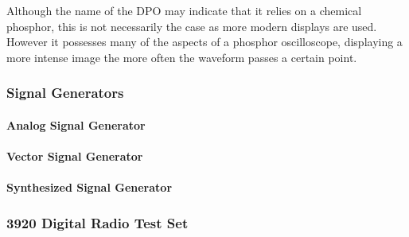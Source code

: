 	Although the name of the DPO may indicate that it relies on a chemical phosphor, this is not necessarily the case as more modern displays are used. However it possesses many of the aspects of a phosphor oscilloscope, displaying a more intense image the more often the waveform passes a certain point.





\subsubsection{Signal Generators}

\paragraph*{Analog Signal Generator}

\paragraph*{Vector Signal Generator}

\paragraph*{Synthesized Signal Generator}

\subsubsection{3920 Digital Radio Test Set}




